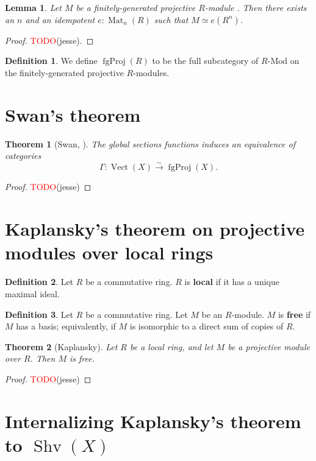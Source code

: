 \documentclass[11pt]{article}
\newcommand{\remph}[1]{\textcolor{red}{#1}}
\newcommand{\TODO}{\remph{TODO}}
\newcommand{\Mat}{\operatorname{Mat}}
\newcommand{\Vect}{\operatorname{Vect}}
\newcommand{\fgProj}{\operatorname{fgProj}}
\newcommand{\Shv}{\operatorname{Shv}}
\theoremstyle{plain}
\newtheorem{lemma}{Lemma}[section]
\newtheorem{theorem}{Theorem}[section]
\theoremstyle{definition}
\newtheorem{definition}{Definition}[section]
\begin{document}
\begin{lemma} \label{lemma-fg-projective-idempotent}
  Let \(M\) be a finitely-generated projective \(R\)-module . Then there exists an \(n\) and an idempotent \(e : \Mat_n(R)\) such that \(M \simeq e(R^n)\).
\end{lemma}

\begin{proof}
  \TODO(jesse).
\end{proof}

\begin{definition} \label{def-category-projective-modules}
  We define \(\fgProj(R)\) to be the full subcategory of \(R\text{-Mod}\) on the finitely-generated projective \(R\)-modules.
\end{definition}

\section{Swan's theorem}

\begin{theorem}[Swan, \cite{swan1962vector}]
  The global sections functions induces an equivalence of categories
  \[\Gamma : \Vect(X) \overset{\sim}{\longrightarrow} \fgProj(X).\]
\end{theorem}

\begin{proof}
  \TODO(jesse)
\end{proof}

\section{Kaplansky's theorem on projective modules over local rings}

\begin{definition}\label{def-local-ring}
  Let \(R\) be a commutative ring. \(R\) is \textbf{local} if it has a unique maximal ideal.
\end{definition}

\begin{definition}\label{def-free-module}
  Let \(R\) be a commutative ring. Let \(M\) be an \(R\)-module. \(M\) is \textbf{free} if \(M\) has a basis; equivalently, if \(M\) is isomorphic to a direct sum of copies of \(R\).
\end{definition}

\begin{theorem}[Kaplansky]\label{thm-kaplansky}
  Let \(R\) be a local ring, and let \(M\) be a projective module over \(R\). Then \(M\) is free.
\end{theorem}

\begin{proof}
  \TODO(jesse)
\end{proof}

\section{Internalizing Kaplansky's theorem to \(\Shv(X)\)}


\end{document}

